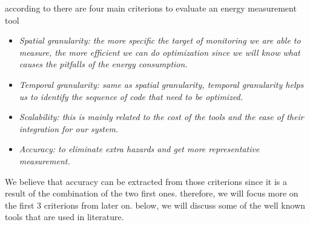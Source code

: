 according to \citeauthor{hackenberg2014hdeem} there are four main criterions to evaluate an energy measurement tool \cite{hackenberg2014hdeem}
\begin{itemize}
    \item \em{Spatial granularity}: the more specific the target of monitoring we are able to measure, the more efficient we can do optimization since we will know what causes the pitfalls of the energy consumption.
    \item \em{Temporal granularity}: same as spatial granularity, temporal granularity helps us to identify the sequence of code that need to be optimized.
    \item \em{Scalability}: this is mainly related to the cost of the tools and the ease of their integration for our system.
    \item  \em{Accuracy}: to eliminate extra hazards and get more representative measurement.
\end{itemize}

We believe that accuracy can be extracted from those criterions since it is a result of the combination of the two first ones. therefore, we will focus more on the first 3 criterions from later on.
below, we will discuss some of the well known tools that are used in literature.
